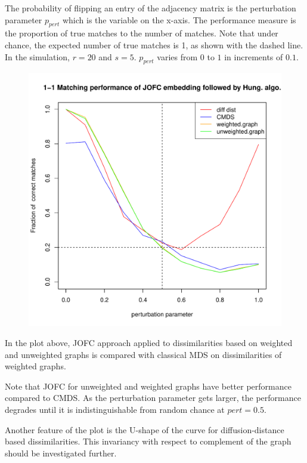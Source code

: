 \documentclass[11pt]{article} %
\begin{document}
  The probability of flipping an entry of the adjacency matrix is the perturbation parameter $p_{pert}$ which is the variable on the x-axis. 
  The performance measure is the proportion of true matches to the number of matches. Note that 
  under chance, the expected number of true matches is 1, as shown with the dashed line. In the simulation, $r=20$ and $s=5$. $p_{pert}$ varies from $0$ to $1$ in increments of $0.1$. 
\begin{figure}
  \includegraphics[scale=0.65]{FidCommPapergraph-plot-1.pdf}
\end{figure}


In the plot above, JOFC approach applied to  dissimilarities based on weighted and unweighted graphs is compared with classical MDS on dissimilarities of weighted graphs.

Note that JOFC for unweighted and weighted graphs  have better performance compared to CMDS. As the perturbation parameter gets larger, the performance degrades until it is indistinguishable from random chance at $pert=0.5$.

Another feature of the plot is the U-shape of the curve for diffusion-distance based dissimilarities. This invariancy with respect to complement of the graph should be investigated further.
\end{document}
